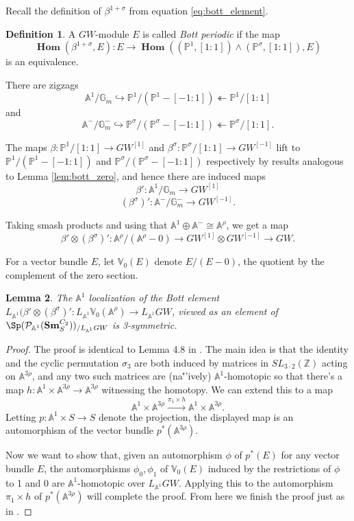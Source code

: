 \documentclass[draftthesis,tocnosub,noragright,centerchapter,10pt]{uiucthesis2009}
\newcommand{\Z}{\mathbb Z}
\newcommand{\mbb}{\mathbb}
\newcommand{\mc}{\mathcal}
\newcommand{\Sm}[1]{\mathbf{Sm}_{#1}}
\DeclareMathOperator{\iHom}{\mathbf{Hom}}
\theoremstyle{plain}
\newtheorem{lemma}{Lemma}
\theoremstyle{definition}
\newtheorem{definition}[lemma]{Definition}
\begin{document}
Recall the definition of $\beta^{1+\sigma}$ from equation
\ref{eq:bott_element}.

\begin{definition}
A $GW$-module $E$ is called \emph{Bott periodic} if the map
\[
\iHom(\beta^{1+\sigma},E): E
\rightarrow \iHom((\mbb P^1,[1:1])\wedge (\mbb P^\sigma,[1:1]),E)
\]
is an equivalence.
\end{definition}

There are zigzags
\[
\mbb A^1/\mbb G_m \hookrightarrow \mbb P^1/(\mbb P^1 - [-1:1])
\twoheadleftarrow \mbb P^1/[1:1]
\]
and 
\[
\mbb A^-/\mbb G_m^- \hookrightarrow \mbb P^\sigma/(\mbb P^\sigma - [-1:1])
\twoheadleftarrow \mbb P^\sigma/[1:1].
\]

The maps $\beta :  \mbb P^1/[1:1] \rightarrow GW^{[1]}$ and
$\beta^\sigma : \mbb P^\sigma/[1:1] \rightarrow GW^{[-1]}$ lift to
$\mbb P^1/(\mbb P^1 - [-1:1])$ and $\mbb P^\sigma/(\mbb P^\sigma -
[-1:1])$ respectively by results analogous to Lemma
\ref{lem:bott_zero}, and hence there are induced maps 
\[
\beta' : \mbb A^1/\mbb G_m \rightarrow GW^{[1]}
\]
\[
(\beta^\sigma)' : \mbb A^-/\mbb G_m^- \rightarrow GW^{[-1]}.
\]

Taking smash products and using that $\mbb A^1 \oplus \mbb A^- \cong
\mbb A^\rho$, we get a map
\[
\beta' \otimes (\beta^\sigma)' : \mbb
A^\rho/(\mbb A^\rho - 0) \rightarrow GW^{[1]} \otimes GW^{[-1]}
\rightarrow GW.
\]

For a vector bundle $E$, let $\mbb V_0(E)$ denote $E/(E-0)$, the
quotient by the complement of the zero section.

\begin{lemma}\label{lem:bott_3symm}
The $\mbb A^1$ localization of the Bott element $L_{\mbb A^1}(\beta'
\otimes (\beta^\sigma)' : L_{\mbb A^1} \mbb V_0(\mbb A^\rho)
\rightarrow L_{\mbb A^1} GW$, viewed as an element of $\Sp(\mc P_{\mbb
  A^1}(\Sm{S}^{C_2}))_{/L_{\mbb A^1}GW}$ is 3-symmetric.
\end{lemma}

\begin{proof}
The proof is identical to Lemma 4.8 in \cite{cdhdesc}. The main idea
is that the identity and the cyclic permutation $\sigma_3$ are both
induced by matrices in $SL_{3\cdot 2}(\Z)$ acting on $\mbb A^{3\rho}$,
and any two such matrices are (na\'''ively) $\mbb A^1$-homotopic so
that there's a map $h: \mbb A^1 \times \mbb A^{3\rho} \rightarrow \mbb
A^{3\rho}$ witnessing the homotopy. We can extend this to a map
\[
\mbb A^1 \times \mbb A^{3\rho} \xrightarrow{\pi_1 \times h} \mbb A^1 \times \mbb A^{3\rho}.
\]
Letting $p : \mbb A^1 \times S \rightarrow S$ denote the projection, the
displayed map is an automorphism of the vector bundle $p^*(\mbb
A^{3\rho})$.

Now we want to show that, given an automorphism $\phi$ of $p^*(E)$ for
any vector bundle $E$, the automorphisms $\phi_0,\phi_1$ of $\mbb
V_0(E)$ induced by the restrictions of $\phi$ to 1 and 0 are $\mbb
A^1$-homotopic over $L_{\mbb A^1}GW$. Applying this to the
automorphism $\pi_1 \times h$ of $p^*(\mbb A^{3\rho})$ will complete
the proof. From here we finish the proof just as in \cite{cdhdesc}.
\end{proof}
\end{document}
